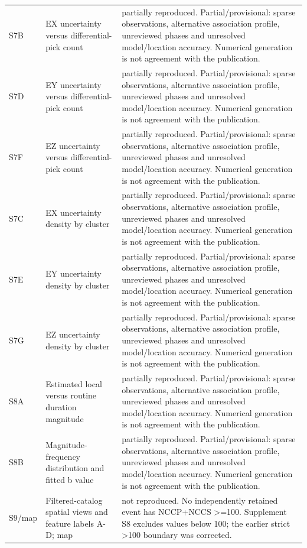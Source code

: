 \begin{longtable}{>{\raggedright\arraybackslash}p{.13\linewidth}>{\raggedright\arraybackslash}p{.28\linewidth}>{\raggedright\arraybackslash}p{.49\linewidth}}
S7B & EX uncertainty versus differential-pick count & partially reproduced. Partial/provisional: sparse observations, alternative association profile, unreviewed phases and unresolved model/location accuracy. Numerical generation is not agreement with the publication.\\[3pt]
S7D & EY uncertainty versus differential-pick count & partially reproduced. Partial/provisional: sparse observations, alternative association profile, unreviewed phases and unresolved model/location accuracy. Numerical generation is not agreement with the publication.\\[3pt]
S7F & EZ uncertainty versus differential-pick count & partially reproduced. Partial/provisional: sparse observations, alternative association profile, unreviewed phases and unresolved model/location accuracy. Numerical generation is not agreement with the publication.\\[3pt]
S7C & EX uncertainty density by cluster & partially reproduced. Partial/provisional: sparse observations, alternative association profile, unreviewed phases and unresolved model/location accuracy. Numerical generation is not agreement with the publication.\\[3pt]
S7E & EY uncertainty density by cluster & partially reproduced. Partial/provisional: sparse observations, alternative association profile, unreviewed phases and unresolved model/location accuracy. Numerical generation is not agreement with the publication.\\[3pt]
S7G & EZ uncertainty density by cluster & partially reproduced. Partial/provisional: sparse observations, alternative association profile, unreviewed phases and unresolved model/location accuracy. Numerical generation is not agreement with the publication.\\[3pt]
S8A & Estimated local versus routine duration magnitude & partially reproduced. Partial/provisional: sparse observations, alternative association profile, unreviewed phases and unresolved model/location accuracy. Numerical generation is not agreement with the publication.\\[3pt]
S8B & Magnitude-frequency distribution and fitted b value & partially reproduced. Partial/provisional: sparse observations, alternative association profile, unreviewed phases and unresolved model/location accuracy. Numerical generation is not agreement with the publication.\\[3pt]
S9/\allowbreak{}map & Filtered-catalog spatial views and feature labels A-D; map & not reproduced. No independently retained event has NCCP+NCCS >=100. Supplement S8 excludes values below 100; the earlier strict >100 boundary was corrected.\\[3pt]

\end{longtable}
